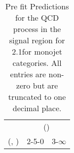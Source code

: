 \begin{table}[h!]
\tiny
\centering
\caption{Pre fit Predictions for the QCD process in the signal region for 2.1\ifb for monojet categories. All entries are non-zero but are truncated to one decimal place.\label{tab:predsepnaive_sig_qcd_mono}}
\begin{tabular}
{ccc}
	\hline\hline
	& \multicolumn{2}{c}{\scalht (\gev)} \\ 
	 (\njet,  \nb) & 2-5-0 & 3-$\infty$ \\ [0.8ex] 
\hline
	\hline
	\hline
\end{tabular}
\end{table}
